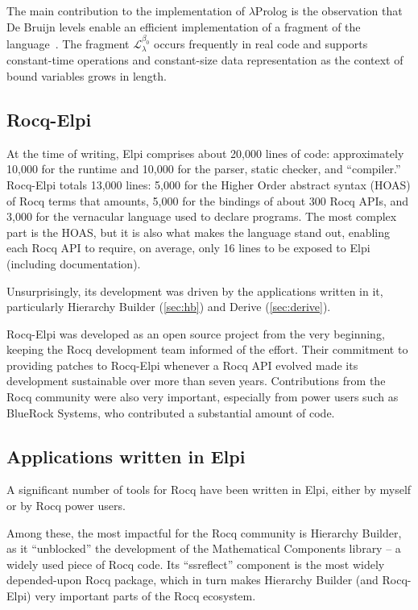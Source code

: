 \documentclass[a4paper, 11pt]{book}
\begin{document}
The main contribution to the implementation of $\lambda$Prolog is the observation that De Bruijn levels enable an efficient implementation of a fragment of the language~\cite{dunchev15lpar}. The fragment $\mathcal{L}_\lambda^{\beta_0}$ occurs frequently in real code and supports constant-time operations and constant-size data representation as the context of bound variables grows in length.

\subsection{Rocq-Elpi}


At the time of writing, Elpi comprises about 20,000 lines of code: approximately 10,000 for the runtime and 10,000 for the parser, static checker, and ``compiler.'' Rocq-Elpi totals 13,000 lines: 5,000 for the Higher Order abstract syntax (HOAS) of Rocq terms that amounts, 5,000 for the bindings of about 300 Rocq APIs, and 3,000 for the vernacular language used to declare programs. The most complex part is the HOAS, but it is also what makes the language stand out, enabling each Rocq API to require, on average, only 16 lines to be exposed to Elpi (including documentation).

Unsurprisingly, its development was driven by the applications written in it, particularly Hierarchy Builder (\cref{sec:hb}) and Derive (\cref{sec:derive}).

Rocq-Elpi was developed as an open source project from the very beginning, keeping the Rocq development team informed of the effort. Their commitment to providing patches to Rocq-Elpi whenever a Rocq API evolved made its development sustainable over more than seven years. Contributions from the Rocq community were also very important, especially from power users such as BlueRock Systems, who contributed a substantial amount of code.

\subsection{Applications written in Elpi}

A significant number of tools for Rocq have been written in Elpi, either by myself or by Rocq power users.

Among these, the most impactful for the Rocq community is Hierarchy Builder, as it ``unblocked'' the development of the Mathematical Components library -- a widely used piece of Rocq code. Its ``ssreflect'' component is the most widely depended-upon Rocq package, which in turn makes Hierarchy Builder (and Rocq-Elpi) very important parts of the Rocq ecosystem.
\end{document}
